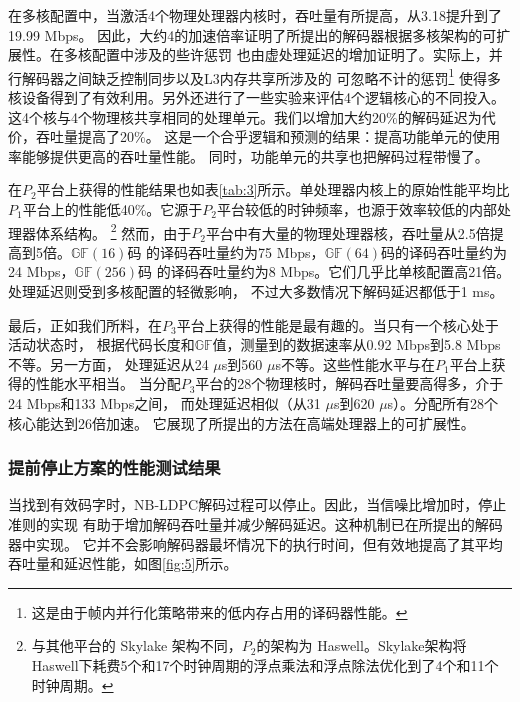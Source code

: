 \documentclass{cjc}
\begin{document}
  在多核配置中，当激活4个物理处理器内核时，吞吐量有所提高，从3.18提升到了19.99 Mbps。
  因此，大约4的加速倍率证明了所提出的解码器根据多核架构的可扩展性。在多核配置中涉及的些许惩罚
  也由虚处理延迟的增加证明了。实际上，并行解码器之间缺乏控制同步以及L3内存共享所涉及的
  可忽略不计的惩罚\footnote{这是由于帧内并行化策略带来的低内存占用的译码器性能。}
  使得多核设备得到了有效利用。另外还进行了一些实验来评估4个逻辑核心的不同投入。
  这4个核与4个物理核共享相同的处理单元。我们以增加大约20\%的解码延迟为代价，吞吐量提高了20\%。
  这是一个合乎逻辑和预测的结果：提高功能单元的使用率能够提供更高的吞吐量性能。
  同时，功能单元的共享也把解码过程带慢了。

  在$P_2$平台上获得的性能结果也如表\ref{tab:3}所示。单处理器内核上的原始性能平均比
  $P_1$平台上的性能低40\%。它源于$P_2$平台较低的时钟频率，也源于效率较低的内部处理器体系结构。
  \footnote{与其他平台的 Skylake 架构不同，$P_2$的架构为 Haswell。Skylake架构将
  Haswell下耗费5个和17个时钟周期的浮点乘法和浮点除法优化到了4个和11个时钟周期。}
  然而，由于$P_2$平台中有大量的物理处理器核，吞吐量从2.5倍提高到5倍。$\mathbb{GF}(16)$码
  的译码吞吐量约为75 Mbps，$\mathbb{GF}(64)$码的译码吞吐量约为24 Mbps，$\mathbb{GF}(256)$码
  的译码吞吐量约为8 Mbps。它们几乎比单核配置高21倍。处理延迟则受到多核配置的轻微影响，
  不过大多数情况下解码延迟都低于1 ms。

  最后，正如我们所料，在$P_3$平台上获得的性能是最有趣的。当只有一个核心处于活动状态时，
  根据代码长度和$\mathbb{GF}$值，测量到的数据速率从0.92 Mbps到5.8 Mbps不等。另一方面，
  处理延迟从24 $\mu$s到560 $\mu$s不等。这些性能水平与在$P_1$平台上获得的性能水平相当。
  当分配$P_3$平台的28个物理核时，解码吞吐量要高得多，介于24 Mbps和133 Mbps之间，
  而处理延迟相似（从31 $\mu$s到620 $\mu$s）。分配所有28个核心能达到26倍加速。
  它展现了所提出的方法在高端处理器上的可扩展性。

\subsubsection{提前停止方案的性能测试结果}

  当找到有效码字时，NB-LDPC解码过程可以停止。因此，当信噪比增加时，停止准则的实现
  有助于增加解码吞吐量并减少解码延迟。这种机制已在所提出的解码器中实现。
  它并不会影响解码器最坏情况下的执行时间，但有效地提高了其平均吞吐量和延迟性能，如图\ref{fig:5}所示。
\end{document}
